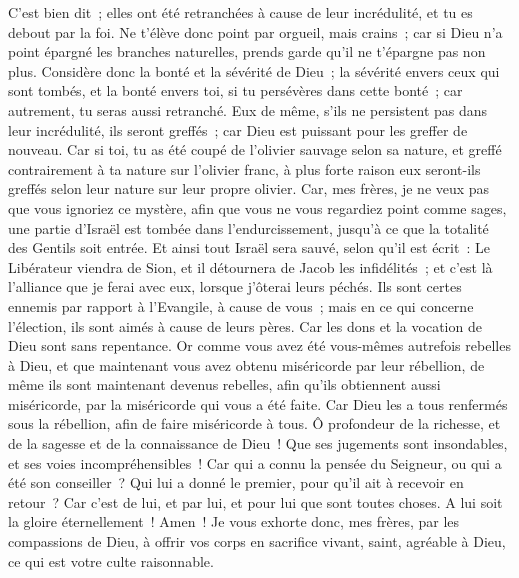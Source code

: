 \begin{multicols}{2}
C'est bien dit~; elles ont été retranchées à cause de leur incrédulité, et tu es debout par la foi. Ne t'élève donc point par orgueil, mais crains~;
car si Dieu n'a point épargné les branches naturelles, prends garde qu'il ne t'épargne pas non plus.
Considère donc la bonté et la sévérité de Dieu~; la sévérité envers ceux qui sont tombés, et la bonté envers toi, si tu persévères dans cette bonté~; car autrement, tu seras aussi retranché.
Eux de même, s'ils ne persistent pas dans leur incrédulité, ils seront greffés~; car Dieu est puissant pour les greffer de nouveau.
Car si toi, tu as été coupé de l'olivier sauvage selon sa nature, et greffé contrairement à ta nature sur l'olivier franc, à plus forte raison eux seront-ils greffés selon leur nature sur leur propre olivier.
Car, mes frères, je ne veux pas que vous ignoriez ce mystère, afin que vous ne vous regardiez point comme sages, une partie d'Israël est tombée dans l'endurcissement, jusqu'à ce que la totalité des Gentils soit entrée.
Et ainsi tout Israël sera sauvé, selon qu'il est écrit~: Le Libérateur viendra de Sion, et il détournera de Jacob les infidélités~;
et c'est là l'alliance que je ferai avec eux, lorsque j'ôterai leurs péchés.
Ils sont certes ennemis par rapport à l'Evangile, à cause de vous~; mais en ce qui concerne l'élection, ils sont aimés à cause de leurs pères.
Car les dons et la vocation de Dieu sont sans repentance.
Or comme vous avez été vous-mêmes autrefois rebelles à Dieu, et que maintenant vous avez obtenu miséricorde par leur rébellion,
de même ils sont maintenant devenus rebelles, afin qu'ils obtiennent aussi miséricorde, par la miséricorde qui vous a été faite.
Car Dieu les a tous renfermés sous la rébellion, afin de faire miséricorde à tous.
Ô profondeur de la richesse, et de la sagesse et de la connaissance de Dieu~! Que ses jugements sont insondables, et ses voies incompréhensibles~!
Car qui a connu la pensée du Seigneur, ou qui a été son conseiller~?
Qui lui a donné le premier, pour qu'il ait à recevoir en retour~?
Car c'est de lui, et par lui, et pour lui que sont toutes choses. A lui soit la gloire éternellement~! Amen~!
\VerseOne{}Je vous exhorte donc, mes frères, par les compassions de Dieu, à offrir vos corps en sacrifice vivant, saint, agréable à Dieu, ce qui est votre culte raisonnable.

\end{multicols}
